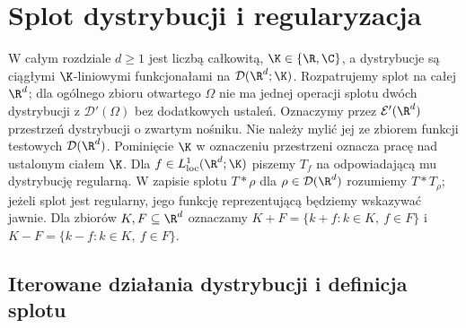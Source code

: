 
\section{Splot dystrybucji i regularyzacja}
\label{sec:splot21}

\providecommand{\atlasref}[2]{#2}


W całym rozdziale $d\ge1$ jest liczbą całkowitą,
$\K\in\{\R,\C\}$, a dystrybucje
są ciągłymi $\K$-liniowymi funkcjonałami na
$\mathcal D(\R^d;\K)$. Rozpatrujemy splot na całej
$\R^d$; dla ogólnego zbioru otwartego $\Omega$ nie ma
jednej operacji splotu dwóch dystrybucji z
$\mathcal D'(\Omega)$ bez dodatkowych ustaleń.
Oznaczymy przez $\mathcal E'(\R^d)$ przestrzeń dystrybucji
o zwartym nośniku. Nie należy mylić jej ze zbiorem funkcji
testowych $\mathcal D(\R^d)$. Pominięcie $\K$ w oznaczeniu
przestrzeni oznacza pracę nad ustalonym ciałem $\K$.
Dla $f\in L^1_{\mathrm{loc}}(\R^d;\K)$ piszemy $T_f$ na
odpowiadającą mu dystrybucję regularną. W zapisie splotu
$T*\rho$ dla $\rho\in\mathcal D(\R^d)$ rozumiemy
$T*T_\rho$; jeżeli splot jest regularny, jego funkcję
reprezentującą będziemy wskazywać jawnie.
Dla zbiorów $K,F\subseteq\R^d$ oznaczamy
$K+F=\{k+f:k\in K,\ f\in F\}$ i
$K-F=\{k-f:k\in K,\ f\in F\}$.

\subsection{Iterowane działania dystrybucji i definicja splotu}

